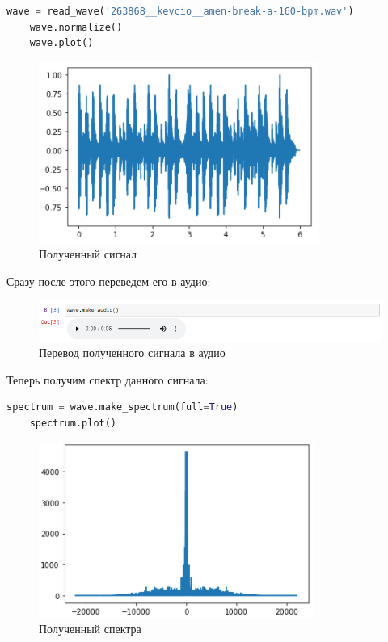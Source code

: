 \documentclass[a4paper]{article}
\begin{document}
\begin{lstlisting}[language=Python, caption= Получение сигнала]
    wave = read_wave('263868__kevcio__amen-break-a-160-bpm.wav')
    wave.normalize()
    wave.plot()
\end{lstlisting}
            
            \begin{figure}[H]
                \centering
                \includegraphics{ex_3_1.png}
                \caption{Полученный сигнал}
                \label{fig:ex_3_1}
            \end{figure}
            
            Сразу после этого переведем его в аудио:
            
            \begin{figure}[H]
                \centering
                \includegraphics[width=\textwidth]{ex_3_2.png}
                \caption{Перевод полученного сигнала в аудио}
                \label{fig:ex_3_2}
            \end{figure}

            Теперь получим спектр данного сигнала:
            
\begin{lstlisting}[language=Python, caption= Получение спектра]
    spectrum = wave.make_spectrum(full=True)
    spectrum.plot()
\end{lstlisting}
            
            \begin{figure}[H]
                \centering
                \includegraphics{ex_3_3.png}
                \caption{Полученный спектра}
                \label{fig:ex_3_3}
            \end{figure}
            
\end{document}

